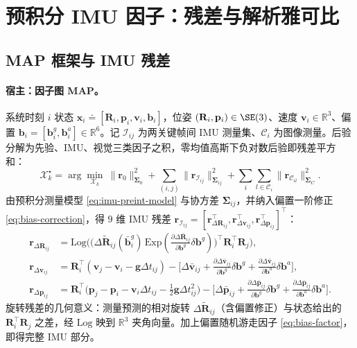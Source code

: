 \section{预积分 IMU 因子：残差与解析雅可比}
\label{sec:imu-factor}

\subsection{MAP 框架与 IMU 残差}
\label{subsec:imu-residual}

\paragraph{宿主：因子图 MAP。}
系统时刻 $i$ 状态 $\mathbf x_i\doteq[\mathbf R_i,\mathbf p_i,\mathbf v_i,\mathbf b_i]$，位姿 $(\mathbf R_i,\mathbf p_i)\in\SE(3)$、速度 $\mathbf v_i\in\mathbb R^3$、偏置 $\mathbf b_i=[\mathbf b_i^g,\mathbf b_i^a]\in\mathbb R^6$。记 $\mathcal I_{ij}$ 为两关键帧间 IMU 测量集、$\mathcal C_i$ 为图像测量。后验分解为先验、IMU、视觉三类因子之积\cite{forster2017preintegration}，零均值高斯下负对数后验即残差平方和：
\begin{equation}
  \mathcal X_k^\star=\arg\min_{\mathcal X_k}\ \|\mathbf r_0\|^2_{\boldsymbol\Sigma_0}+\sum_{(i,j)}\|\mathbf r_{\mathcal I_{ij}}\|^2_{\boldsymbol\Sigma_{ij}}+\sum_{i}\sum_{l\in\mathcal C_i}\|\mathbf r_{\mathcal C_{il}}\|^2_{\boldsymbol\Sigma_C}.
  \label{eq:imu-map}
\end{equation}
由预积分测量模型 \cref{eq:imu-preint-model} 与协方差 $\boldsymbol\Sigma_{ij}$，并纳入偏置一阶修正 \cref{eq:bias-correction}，得 $9$ 维 IMU 残差 $\mathbf r_{\mathcal I_{ij}}=[\mathbf r_{\Delta\mathbf R_{ij}}^\top,\mathbf r_{\Delta\mathbf v_{ij}}^\top,\mathbf r_{\Delta\mathbf p_{ij}}^\top]^\top$：
\begin{equation}
\boxed{\;
\begin{aligned}
  \mathbf r_{\Delta\mathbf R_{ij}}&=\mathrm{Log}\!\Big(\big(\Delta\tilde{\mathbf R}_{ij}(\bar{\mathbf b}_i^g)\,\mathrm{Exp}(\tfrac{\partial\Delta\bar{\mathbf R}_{ij}}{\partial\mathbf b^g}\delta\mathbf b^g)\big)^\top\mathbf R_i^\top\mathbf R_j\Big),\\
  \mathbf r_{\Delta\mathbf v_{ij}}&=\mathbf R_i^\top(\mathbf v_j-\mathbf v_i-\mathbf g\Delta t_{ij})-\Big[\Delta\bar{\mathbf v}_{ij}+\tfrac{\partial\Delta\bar{\mathbf v}_{ij}}{\partial\mathbf b^g}\delta\mathbf b^g+\tfrac{\partial\Delta\bar{\mathbf v}_{ij}}{\partial\mathbf b^a}\delta\mathbf b^a\Big],\\
  \mathbf r_{\Delta\mathbf p_{ij}}&=\mathbf R_i^\top\Big(\mathbf p_j-\mathbf p_i-\mathbf v_i\Delta t_{ij}-\tfrac12\mathbf g\Delta t_{ij}^2\Big)-\Big[\Delta\bar{\mathbf p}_{ij}+\tfrac{\partial\Delta\bar{\mathbf p}_{ij}}{\partial\mathbf b^g}\delta\mathbf b^g+\tfrac{\partial\Delta\bar{\mathbf p}_{ij}}{\partial\mathbf b^a}\delta\mathbf b^a\Big].
\end{aligned}
\;}
  \label{eq:imu-residual}
\end{equation}
旋转残差的几何意义：测量预测的相对旋转 $\Delta\tilde{\mathbf R}_{ij}$（含偏置修正）与状态给出的 $\mathbf R_i^\top\mathbf R_j$ 之差，经 $\mathrm{Log}$ 映到 $\mathbb R^3$ 夹角向量。加上偏置随机游走因子 \cref{eq:bias-factor}，即得完整 IMU 部分。

